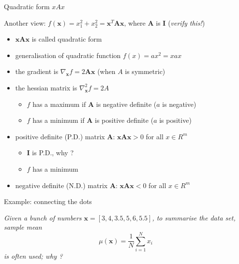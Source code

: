\documentclass{scrartcl}
\def\tightlist{}
\newcommand{\vv}[1]{\boldsymbol{#1}}
\begin{document}
\begin{frame}{Quadratic form \(xAx\)}
\protect\hypertarget{quadratic-form-xax}{}

Another view: \(f(\vv{x}) = x_1^2 +x_2^2= \vv{x}^T \vv{A} \vv{x}\),
where \(\vv{A}\) is \(\vv{I}\) (\emph{verify this!})

\begin{itemize}
\tightlist
\item
  \(\vv{xAx}\) is called quadratic form
\item
  generalisation of quadratic function \(f(x) = ax^2 = xax\)
\item
  the gradient is \(\nabla_{\vv{x}} f = 2\vv{A}\vv{x}\) (when \(A\) is
  symmetric)
\item
  the hessian matrix is \(\nabla_{\vv{x}}^2 f = 2A\)

  \begin{itemize}
  \tightlist
  \item
    \(f\) has a maximum if \(\vv{A}\) is negative definite (\(a\) is
    negative)
  \item
    \(f\) has a minimum if \(\vv{A}\) is positive definite (\(a\) is
    positive)
  \end{itemize}
\item
  positive definite (P.D.) matrix \(\vv{A}\): \(\vv{xAx} >0\) for all
  \(x\in R^m\)

  \begin{itemize}
  \tightlist
  \item
    \(\vv{I}\) is P.D., why ?
  \item
    \(f\) has a minimum
  \end{itemize}
\item
  negative definite (N.D.) matrix \(\vv{A}\): \(\vv{xAx} <0\) for all
  \(x\in R^m\)
\end{itemize}

\end{frame}

\begin{frame}{Example: connecting the dots}
\protect\hypertarget{example-connecting-the-dots}{}

\emph{Given a bunch of numbers \(\vv{x} = [3, 4, 3.5, 5, 6, 5.5]\), to
summarise the data set, sample mean
\[\mu(\vv{x}) = \frac{1}{N} \sum_{i=1}^N {x_i}\] is often used; why ? }

\end{frame}
\end{document}
